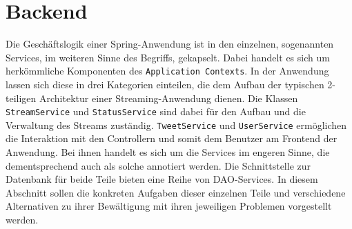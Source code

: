 \section{Backend}

Die Geschäftslogik einer Spring-Anwendung ist in den einzelnen, sogenannten Services, im 
weiteren Sinne des Begriffs, gekapselt. Dabei handelt es sich um herkömmliche Komponenten des 
\texttt{Application Contexts}. In der Anwendung lassen sich diese in drei Kategorien einteilen, 
die dem Aufbau der typischen 2-teiligen Architektur einer Streaming-Anwendung dienen. Die 
Klassen \texttt{StreamService} und \texttt{StatusService} sind dabei für den Aufbau und die 
Verwaltung des Streams zuständig. \texttt{TweetService} und \texttt{UserService} ermöglichen die 
Interaktion mit den Controllern und somit dem Benutzer am Frontend der Anwendung. Bei ihnen 
handelt es sich um die Services im engeren Sinne, die dementsprechend auch als solche annotiert 
werden. Die Schnittstelle zur Datenbank für beide Teile bieten eine Reihe von \acs{DAO}-Services.
In  diesem Abschnitt sollen die konkreten Aufgaben dieser einzelnen Teile und verschiedene Alternativen zu 
ihrer Bewältigung mit ihren jeweiligen 
Problemen vorgestellt werden.

